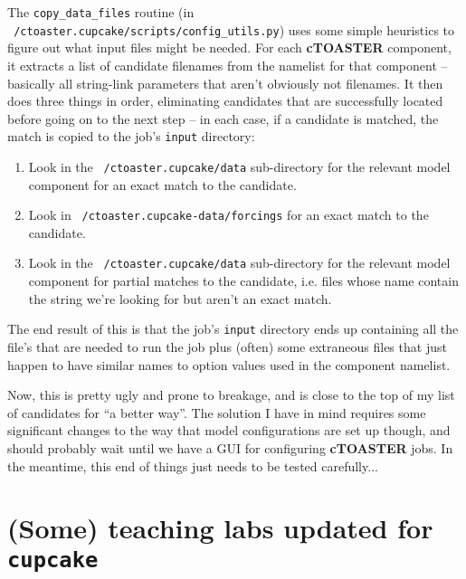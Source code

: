 \documentclass[a4paper,10pt,article]{memoir}
\begin{document}
The \texttt{copy\_data\_files} routine (in
\texttt{~/ctoaster.cupcake/scripts/config\_utils.py}) uses some simple
heuristics to figure out what input files might be needed.  For each
\textbf{cTOASTER} component, it extracts a list of candidate filenames from the
namelist for that component -- basically all string-link parameters
that aren't obviously not filenames.  It then does three things in
order, eliminating candidates that are successfully located before
going on to the next step -- in each case, if a candidate is matched,
the match is copied to the job's \texttt{input} directory:
\begin{enumerate}
  \item{Look in the \texttt{~/ctoaster.cupcake/data} sub-directory for the
    relevant model component for an exact match to the candidate.}
  \item{Look in \texttt{~/ctoaster.cupcake-data/forcings} for an exact match to
    the candidate.}
  \item{Look in the \texttt{~/ctoaster.cupcake/data} sub-directory for the
    relevant model component for partial matches to the candidate,
    i.e. files whose name contain the string we're looking for but
    aren't an exact match.}
\end{enumerate}

The end result of this is that the job's \texttt{input} directory ends
up containing all the file's that are needed to run the job plus
(often) some extraneous files that just happen to have similar names
to option values used in the component namelist.

Now, this is pretty ugly and prone to breakage, and is close to the
top of my list of candidates for ``a better way''.  The solution I
have in mind requires some significant changes to the way that model
configurations are set up though, and should probably wait until we
have a GUI for configuring \textbf{cTOASTER} jobs.  In the meantime, this end of
things just needs to be tested carefully...

\newpage

\appendix
\chapter{(Some) teaching labs updated for \texttt{cupcake}}
\end{document}
